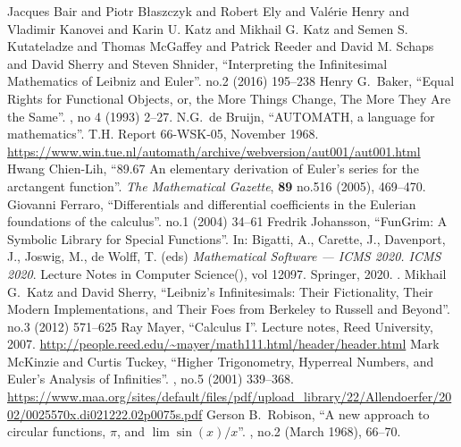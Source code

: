 \begin{thebibliography}{99}\setlength{\parskip}{0pt}
  \setlength{\itemsep}{0pt plus 0.3ex}%
{}
  Jacques Bair and Piotr B{\l}aszczyk and Robert Ely and Val{\'{e}}rie Henry and Vladimir Kanovei and Karin U. Katz and Mikhail G. Katz and Semen S. Kutateladze and Thomas McGaffey and Patrick Reeder and David M. Schaps and David Sherry and Steven Shnider,
  ``Interpreting the Infinitesimal Mathematics of Leibniz and Euler''.
   no.2 (2016) 195--238
  {\tt{}}
  Henry G.~Baker,
  ``Equal Rights for Functional Objects, or, the More Things Change, The More They Are the Same''.
   , no 4 (1993)
  2--27.\newline
  {\tt{}}
  N.G.~de Bruijn,
  ``AUTOMATH, a language for mathematics''.
  T.H. Report 66-WSK-05, November 1968.\newline
  \url{https://www.win.tue.nl/automath/archive/webversion/aut001/aut001.html}
  Hwang Chien-Lih,
  ``89.67 An elementary derivation of Euler's series for the arctangent function''.
  \textit{The Mathematical Gazette}, \textbf{89} no.516 (2005), 469--470.
  {\tt{}}
  Giovanni Ferraro,
  ``Differentials and differential coefficients in the Eulerian foundations of the calculus''.
   no.1 (2004) 34--61
  {\tt{}}
  Fredrik Johansson,
  ``FunGrim: A Symbolic Library for Special Functions''.
  In: Bigatti, A., Carette, J., Davenport, J., Joswig, M., de Wolff, T.
  (eds)
  \textit{Mathematical Software --- ICMS 2020. ICMS 2020}.
  Lecture Notes in Computer Science(), vol 12097. Springer, 2020.\newline
  {\tt{}}.
  Mikhail G.\ Katz and David Sherry,
  ``Leibniz's Infinitesimals: Their Fictionality, Their Modern Implementations, and Their Foes from Berkeley to Russell and Beyond''.
    no.3 (2012) 571--625
  {\tt{}} 
  Ray Mayer,
  ``Calculus I''.
  Lecture notes, Reed University, 2007.\newline
  \url{http://people.reed.edu/~mayer/math111.html/header/header.html}
 Mark McKinzie and Curtis Tuckey,
  ``Higher Trigonometry, Hyperreal Numbers, and Euler's Analysis of Infinities''.
   , no.5 (2001) 339--368.\newline
\url{https://www.maa.org/sites/default/files/pdf/upload_library/22/Allendoerfer/2002/0025570x.di021222.02p0075s.pdf}
 Gerson B.~Robison,
  ``A new approach to circular functions, $\pi$, and $\lim\sin(x)/x$''.
   , no.2 (March 1968), 66--70.\newline
{\tt{}}
\end{thebibliography}
